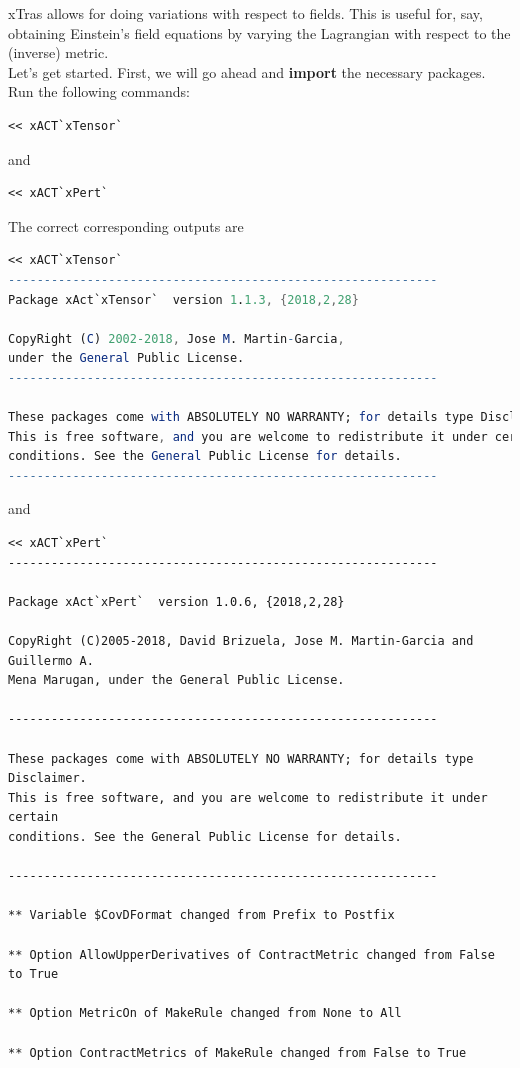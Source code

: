 \documentclass{book}
\theoremstyle{definition}
\begin{document}
xTras allows for doing variations with respect to fields. This is useful for, say, obtaining Einstein's field equations by varying the Lagrangian with respect to the (inverse) metric. \\

Let's get started. First, we will go ahead and \textbf{import} the necessary packages. Run the following commands:
\begin{lstlisting}
<< xACT`xTensor`
\end{lstlisting}
and
\begin{lstlisting}
<< xACT`xPert`
\end{lstlisting}
The correct corresponding outputs are
\begin{lstlisting}[language=mathematica]
<< xACT`xTensor`
------------------------------------------------------------
Package xAct`xTensor`  version 1.1.3, {2018,2,28}

CopyRight (C) 2002-2018, Jose M. Martin-Garcia, 
under the General Public License.
------------------------------------------------------------

These packages come with ABSOLUTELY NO WARRANTY; for details type Disclaimer. 
This is free software, and you are welcome to redistribute it under certain 
conditions. See the General Public License for details.
------------------------------------------------------------
\end{lstlisting}
and
\begin{lstlisting}
<< xACT`xPert`
------------------------------------------------------------

Package xAct`xPert`  version 1.0.6, {2018,2,28}

CopyRight (C)2005-2018, David Brizuela, Jose M. Martin-Garcia and Guillermo A.
Mena Marugan, under the General Public License.

------------------------------------------------------------

These packages come with ABSOLUTELY NO WARRANTY; for details type Disclaimer. 
This is free software, and you are welcome to redistribute it under certain 
conditions. See the General Public License for details.

------------------------------------------------------------

** Variable $CovDFormat changed from Prefix to Postfix

** Option AllowUpperDerivatives of ContractMetric changed from False to True

** Option MetricOn of MakeRule changed from None to All

** Option ContractMetrics of MakeRule changed from False to True

\end{lstlisting}
\end{document}
